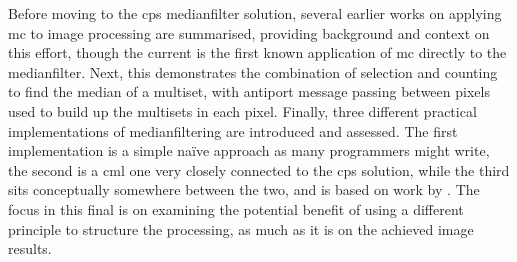 Before moving to the \gls{cps} \gls{medianfilter} solution, several earlier works on applying \gls{mc} to image processing are summarised, providing background and context on this effort, though the current  is the first known application of \gls{mc} directly to the \gls{medianfilter}.  Next, this  demonstrates the combination of selection and counting to find the median of a multiset, with antiport message passing between pixels used to build up the multisets in each pixel.  Finally, three different practical implementations of \gls{medianfilter}ing are introduced and assessed.  The first implementation is a simple naïve approach as many programmers might write, the second is a \gls{cml} one very closely connected to the \gls{cps} solution, while the third sits conceptually somewhere between the two, and is based on work by \citeauthor{Braunl2001} \cite{Braunl2001}.  The focus in this final  is on examining the potential benefit of using a different principle to structure the processing, as much as it is on the achieved image results.